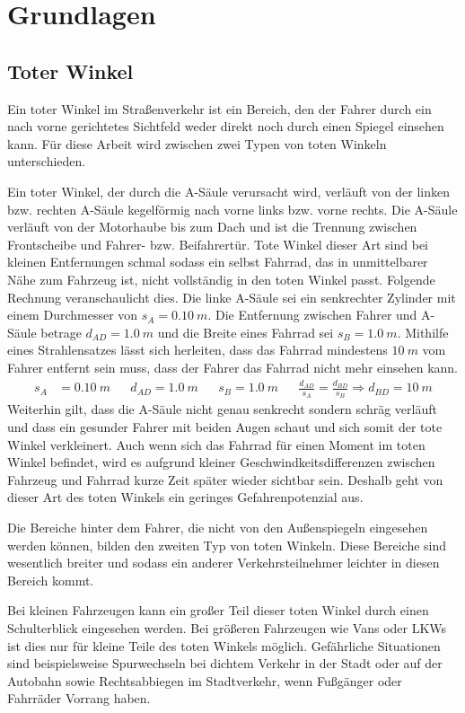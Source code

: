 \chapter{Grundlagen}
	\section{Toter Winkel}
		Ein toter Winkel im Straßenverkehr ist ein Bereich, den der Fahrer durch ein nach vorne gerichtetes Sichtfeld weder direkt noch durch einen Spiegel einsehen kann. Für diese Arbeit wird zwischen zwei Typen von toten Winkeln unterschieden.
		
		Ein toter Winkel, der durch die A-Säule verursacht wird, verläuft von der linken bzw. rechten A-Säule kegelförmig nach vorne links bzw. vorne rechts. Die A-Säule verläuft von der Motorhaube bis zum Dach und ist die Trennung zwischen Frontscheibe und Fahrer- bzw. Beifahrertür. Tote Winkel dieser Art sind bei kleinen Entfernungen schmal sodass ein selbst Fahrrad, das in unmittelbarer Nähe zum Fahrzeug ist, nicht vollständig in den toten Winkel passt. Folgende Rechnung veranschaulicht dies.
		Die linke A-Säule sei ein senkrechter Zylinder mit einem Durchmesser von $s_{A}=\SI{0,10}{m}$. Die Entfernung zwischen Fahrer und A-Säule betrage $d_{AD}=\SI{1,0}{m}$ und die Breite eines Fahrrad sei $s_{B}=\SI{1.0}{m}$. Mithilfe eines Strahlensatzes lässt sich herleiten, dass das Fahrrad mindestens $\SI{10}{m}$ vom Fahrer entfernt sein muss, dass der Fahrer das Fahrrad nicht mehr einsehen kann.
		\begin{align*}
			s_{A}&=\SI{0,10}{m} & &d_{AD}=\SI{1,0}{m} && s_{B}=\SI{1.0}{m} && \frac{d_{AD}}{s_A}=\frac{d_{BD}}{s_{B}} \Rightarrow d_{BD}=\SI{10}{m}
		\end{align*}
		Weiterhin gilt, dass die A-Säule nicht genau senkrecht sondern schräg verläuft und dass ein gesunder Fahrer mit beiden Augen schaut und sich somit der tote Winkel verkleinert. Auch wenn sich das Fahrrad für einen Moment im toten Winkel befindet, wird es aufgrund kleiner Geschwindkeitsdifferenzen zwischen Fahrzeug und Fahrrad kurze Zeit später wieder sichtbar sein. Deshalb geht von dieser Art des toten Winkels ein geringes Gefahrenpotenzial aus.
		
		Die Bereiche hinter dem Fahrer, die nicht von den Außenspiegeln eingesehen werden können, bilden den zweiten Typ von toten Winkeln. Diese Bereiche sind wesentlich breiter und sodass ein anderer Verkehrsteilnehmer leichter in diesen Bereich kommt.
		
		Bei kleinen Fahrzeugen kann ein großer Teil dieser toten Winkel durch einen Schulterblick eingesehen werden. Bei größeren Fahrzeugen wie Vans oder LKWs ist dies nur für kleine Teile des toten Winkels möglich. Gefährliche Situationen sind beispielsweise Spurwechseln bei dichtem Verkehr in der Stadt oder auf der Autobahn sowie Rechtsabbiegen im Stadtverkehr, wenn Fußgänger oder Fahrräder Vorrang haben.
